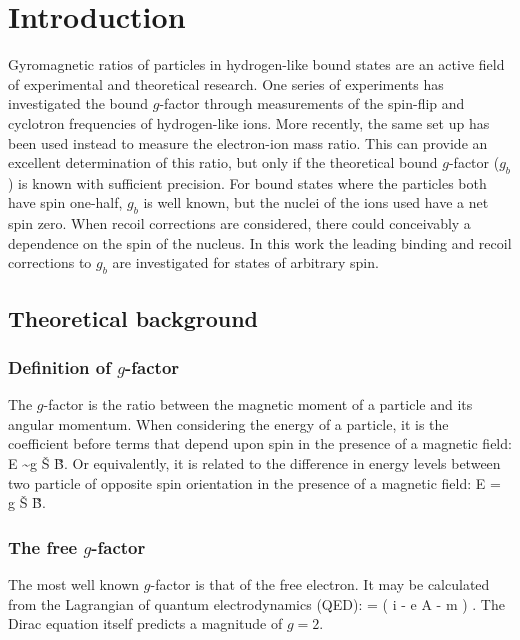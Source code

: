 \chapter{Introduction}

Gyromagnetic ratios of particles in hydrogen-like bound states are an active field of experimental and theoretical research.  One series of experiments has investigated the bound $g$-factor through measurements of the spin-flip and cyclotron frequencies of hydrogen-like ions.  More recently, the same set up has been used instead to measure the electron-ion mass ratio.  This can provide an excellent determination of this ratio, but only if the theoretical bound $g$-factor ($g_b$) is known with sufficient precision.  For bound states where the particles both have spin one-half, $g_b$ is well known, but the nuclei of the ions used have a net spin zero.  When recoil corrections are considered, there could conceivably a dependence on the spin of the nucleus.  In this work the leading binding and recoil corrections to $g_b$ are investigated for states of arbitrary spin.



\section{Theoretical background}


\subsection{Definition of $g$-factor}
The $g$-factor is the ratio between the magnetic moment of a particle and its angular momentum.  When considering the energy of a particle, it is the coefficient before terms that depend upon spin in the presence of a magnetic field:
 \beq
 	E \sim  g  \v{S} \cdot \v{B}.
 \eeq
Or equivalently, it is related to the difference in energy levels between two particle of opposite spin orientation in the presence of a magnetic field:
\beq
	\Delta E =  g  \v{S} \cdot \v{B}.
\eeq


\subsection{The free $g$-factor}
The most well known $g$-factor is that of the free electron.  It may be calculated from the Lagrangian of quantum electrodynamics (QED):
\beq
	 = \Psibar \left( i \partial \cdot \gamma - e A \cdot \gamma - m \right ) \Psi.
\eeq
The Dirac equation itself predicts a magnitude of $g=2$.  

